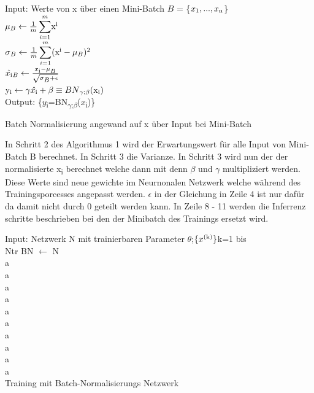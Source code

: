 \documentclass{llncs}
\begin{document}
\begin{algorithm}[H]
Input: Werte von x über einen Mini-Batch $B$ = \{$x\textsubscript{1},...,x\textsubscript{n}$\}\\
\begin{math}
\mu\textsubscript{$B$}\leftarrow\frac{1}{m}\displaystyle\sum_{i=1}^{m}$x$\textsuperscript{i}
\end{math}\\
\begin{math}
\sigma\textsubscript{$B$}\leftarrow\frac{1}{m}\displaystyle\sum_{i=1}^{m}($x$\textsuperscript{i} - \mu\textsubscript{$B$})\textsuperscript{2}
\end{math}\\
\begin{math}
\hat{x\textsubscript{i}}\textsubscript{$B$}\leftarrow\frac{x\textsubscript{i}-\mu\textsubscript{$B$}}{\sqrt{\sigma\textsubscript{$B$} + \epsilon}}
\end{math}\\
\begin{math}
$y$\textsubscript{i}\leftarrow\gamma\hat{x\textsubscript{i}} + \beta \equiv BN\textsubscript{$\gamma$;$\beta$}($x$\textsubscript{i})
\end{math}\\
Output: \{$y$\textsubscript{i}=BN\textsubscript{$\gamma$;$\beta$}($x$\textsubscript{i})\}
\caption{Batch Normalisierung angewand auf x über Input bei Mini-Batch  }	
\end{algorithm}

In Schritt 2 des Algorithmus 1 wird der Erwartungswert für alle Input von Mini-Batch B berechnet. In Schritt 3 die Varianze. In Schritt 3 wird nun der der normalisierte x\textsubscript{i} berechnet welche dann mit denn $\beta$ und $\gamma$ multipliziert werden. Diese Werte sind neue gewichte im Neurnonalen Netzwerk welche während des Trainingsporcesses angepasst werden. $\epsilon$ in der Gleichung in Zeile 4 ist nur dafür da damit nicht durch 0 geteilt werden kann. In Zeile 8 - 11 werden die Inferrenz schritte beschrieben bei den der Minibatch des Trainings ersetzt wird. 

\begin{algorithm}[H]
	Input: Netzwerk N mit trainierbaren Parameter $\theta$;$\{x\textsuperscript{(k)}\}$k=1 bis 	
	\\	
	Ntr BN $\leftarrow$ N	
	\\a\\a\\a\\a\\a\\a\\a\\a\\a\\a\\

	\caption{Training mit Batch-Normalisierungs Netzwerk}	
\end{algorithm}
\end{document}
